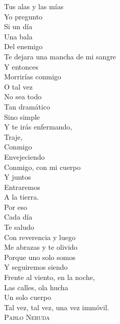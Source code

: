 \documentclass{memoir}
\begin{document}
Tus alas y las mías\\
Yo pregunto\\
Si un día\\
Una bala\\
Del enemigo\\
Te dejara una mancha de mi sangre\\
Y entonces\\
Morrirías conmigo\\
O tal vez\\
No sea todo\\
Tan dramático\\
Sino simple\\
Y te irás enfermando,\\
Traje,\\
Conmigo\\
Envejeciendo\\
Conmigo, con mi cuerpo\\
Y juntos\\
Entraremos\\
A la tierra.\\
Por eso\\
Cada día\\
Te saludo\\
Con reverencia y luego\\
Me abrazas y te olivido\\
Porque uno solo somos\\
Y seguiremos siendo\\
Frente al viento, en la noche,\\
Las calles, ola hucha\\
Un solo cuerpo\\
Tal vez, tal vez, una vez immóvil.\\

\vspace{11pt}
\hspace{80pt} \textsc{Pablo Neruda}\\
\end{document}
